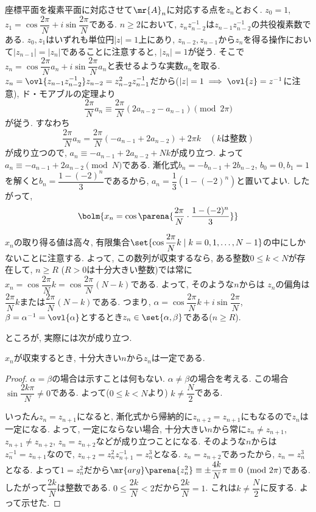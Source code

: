 座標平面を複素平面に対応させて$\mr{A}_n$に対応する点を$z_n$とおく. $z_0=1$, $z_1 = \cos{\dfrac{2\pi}{N}} + i\sin{\dfrac{2\pi}{N}}$である.  $n\geq 2$において, $z_{n}z_{n-2}^{-1}$は$z_{n-1}z_{n-2}^{-1}$の共役複素数である. $z_0,z_1$はいずれも単位円$|z|=1$上にあり, $z_{n-2},z_{n-1}$から$z_n$を得る操作において$|z_{n-1}|=|z_n|$であることに注意すると, $|z_n|=1$が従う. そこで$z_n = \cos{\dfrac{2\pi}{N}a_n} + i\sin{\dfrac{2\pi}{N}a_n}$と表せるような実数$a_n$を取る. $z_n = \ovl{z_{n-1}z_{n-2}^{-1}}z_{n-2} = z_{n-2}^{2}z_{n-1}^{-1}$だから($|z|=1\implies \ovl{z} = z^{-1}$に注意), ド・モアブルの定理より
\[\dfrac{2\pi}{N}a_{n} \equiv \dfrac{2\pi}{N}(2a_{n-2} - a_{n-1})\pmod{2\pi}\]
が従う. すなわち
\[\dfrac{2\pi}{N}a_n = \dfrac{2\pi}{N}(-a_{n-1} + 2a_{n-2}) + 2\pi k\quad (kは整数)\]
が成り立つので, $a_{n} \equiv -a_{n-1} + 2a_{n-2} + Nk$が成り立つ.
よって$a_n \equiv -a_{n-1} + 2a_{n-2} \pmod{N}$である. 漸化式$b_{n} = -b_{n-1} + 2b_{n-2}$, $b_0=0, b_1=1$を解くと$b_n = \dfrac{1-(-2)^n}{3}$であるから, $a_n = \dfrac{1}{3}(1-(-2)^n)$と置いてよい. したがって, 
\[\bolm{x_n = \cos{\parena{\dfrac{2\pi}{N}\cdot \dfrac{1-(-2)^n}{3}}}}\]


$x_n$の取り得る値は高々, 有限集合$\set{\cos{\dfrac{2\pi}{N}k}\mid k=0,1,\dots, N-1}$の中にしかないことに注意する. 
よって, この数列が収束するなら, ある整数$0\leq k < N$が存在して, $n\geq R$ ($R>0$は十分大きい整数)では常に$x_n = \cos{\dfrac{2\pi}{N}k} = \cos{\dfrac{2\pi}{N}(N-k)}$である. よって, そのような$n$からは $z_n$の偏角は$\dfrac{2\pi}{N}k$または$\dfrac{2\pi}{N}(N-k)$である. つまり, $\alpha = \cos{\dfrac{2\pi}{N}k} + i\sin{\dfrac{2\pi}{N}}$, $\beta = \alpha^{-1} = \ovl{\alpha}$とするとき$z_n \in \set{\alpha,\beta}$である($n\geq R$). \par 
ところが, 実際には次が成り立つ. 
 
\begin{claim} 
$x_n$が収束するとき, 十分大きい$n$から$z_n$は一定である. 
\end{claim} 
\begin{proof} $\alpha = \beta$の場合は示すことは何もない. $\alpha\neq \beta$の場合を考える. この場合$\sin{\dfrac{2k\pi}{N}} \neq 0$である. よって($0\leq k<N$より) $k \neq \dfrac{N}{2}$である. \par 
いったん$z_{n} = z_{n+1}$になると, 漸化式から帰納的に$z_{n+2} = z_{n+1}$にもなるので$z_n$は一定になる. よって, 一定にならない場合, 十分大きい$n$から常に$z_n\neq z_{n+1}$, $z_{n+1} \neq z_{n+2}$, $z_n = z_{n+2}$などが成り立つことになる. そのような$n$からは$z_n^{-1} = z_{n+1}$なので, $z_{n+2} = z_n^2 z_{n+1}^{-1} = z_n^3$となる. $z_n = z_{n+2}$であったから, $z_n = z_n^3$となる. よって$1 = z_n^2$だから$\mr{arg}\parena{z_n^2} \equiv \pm \dfrac{4k}{N}\pi \equiv 0 \pmod{2\pi}$である. したがって$\dfrac{2k}{N}$は整数である. $0\leq \dfrac{2k}{N} < 2$だから$\dfrac{2k}{N}=1$. これは$k\neq \dfrac{N}{2}$に反する. よって示せた. 
\end{proof}

